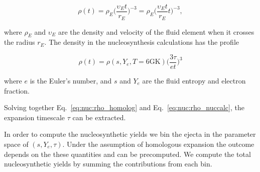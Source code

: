 \begin{equation}
    \rho(t) = \rho_E\Big(\frac{\upsilon_E t}{r_E}\Big)^{-3} = 
    \rho_E\Big(\frac{\upsilon_E t}{r_E}t\Big)^{-3},
    \label{eq:nuc:rho_homolog}
\end{equation}

where $\rho_E$ and $\upsilon_E$ are the density and velocity of the fluid element 
when it crosses the radius $r_E$. 
The density in the nucleosynthesis calculations has the profile \citep{Lippuner:2015gwa} 

\begin{equation}
    \rho(t) = \rho(s, Y_e, T=6\text{GK})\Big(\frac{3\tau}{e t}\Big)^3
    \label{eq:nuc:rho_nuccalc}
\end{equation}

where $e$ is the Euler's number, and $s$ and $Y_e$ are the fluid entropy and 
electron fraction.

Solving together Eq.~\eqref{eq:nuc:rho_homolog} and Eq.~\eqref{eq:nuc:rho_nuccalc},
the expansion timescale $\tau$ can be extracted.

In order to compute the nucleosynthetic yields we bin the ejecta in the 
parameter space of $(s, Y_e, \tau)$. 
Under the assumption of homologous expansion the \rproc{} outcome depends on 
the these quantities and can be precomputed.
We compute the total nucleosynthetic yields by summing the contributions from 
each bin.


